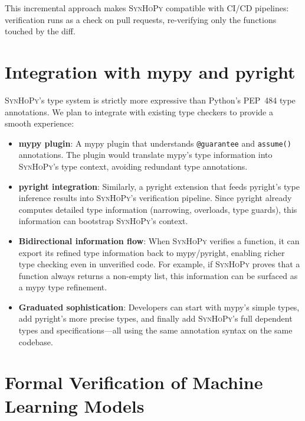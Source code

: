 \documentclass[11pt,a4paper]{report}
\theoremstyle{definition}
\theoremstyle{plain}
\newcommand{\synhopy}{\textsc{SynHoPy}}
\begin{document}
This incremental approach makes \synhopy{} compatible with CI/CD pipelines:
verification runs as a check on pull requests, re-verifying only the
functions touched by the diff.

\section{Integration with mypy and pyright}

\synhopy{}'s type system is strictly more expressive than Python's PEP~484
type annotations.  We plan to integrate with existing type checkers to
provide a smooth experience:

\begin{itemize}
  \item \textbf{mypy plugin}: A mypy plugin that understands
    \lstinline[style=synhopy]{@guarantee} and
    \lstinline[style=synhopy]{assume()} annotations.  The plugin would
    translate mypy's type information into \synhopy{}'s type context,
    avoiding redundant type annotations.

  \item \textbf{pyright integration}: Similarly, a pyright extension
    that feeds pyright's type inference results into \synhopy{}'s
    verification pipeline.  Since pyright already computes detailed
    type information (narrowing, overloads, type guards), this
    information can bootstrap \synhopy{}'s context.

  \item \textbf{Bidirectional information flow}: When \synhopy{} verifies
    a function, it can export its refined type information back to mypy/pyright,
    enabling richer type checking even in unverified code.  For example, if
    \synhopy{} proves that a function always returns a non-empty list, this
    information can be surfaced as a mypy type refinement.

  \item \textbf{Graduated sophistication}: Developers can start with mypy's
    simple types, add pyright's more precise types, and finally add \synhopy{}'s
    full dependent types and specifications---all using the same annotation
    syntax on the same codebase.
\end{itemize}

\section{Formal Verification of Machine Learning Models}
\end{document}

